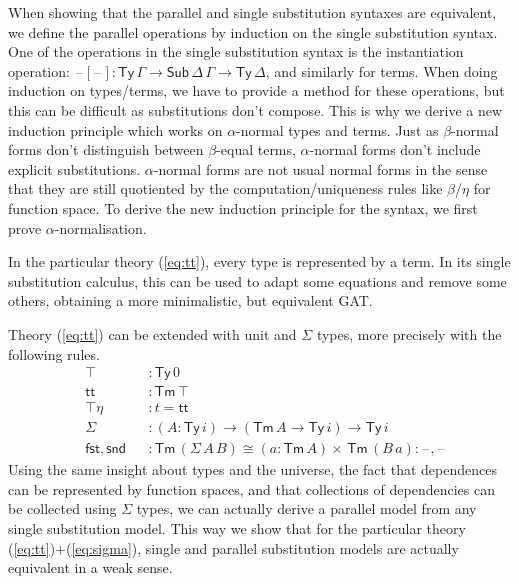 \documentclass[sigplan,10pt,anonymous,review]{acmart}\settopmatter{printfolios=true,printccs=false,printacmref=false}
\newcommand{\ra}{\rightarrow}
\newcommand{\Ty}{\mathsf{Ty}}
\newcommand{\Tm}{\mathsf{Tm}}
\newcommand{\Sub}{\mathsf{Sub}}
\newcommand{\blank}{\mathord{\hspace{1pt}\text{--}\hspace{1pt}}} %
\renewcommand{\tt}{\mathsf{tt}}
\newcommand{\fst}{\mathsf{fst}}
\newcommand{\snd}{\mathsf{snd}}
\begin{document}
When showing that the parallel and single substitution syntaxes are
equivalent, we define the parallel operations by induction on the
single substitution syntax. One of the operations in the single
substitution syntax is the instantiation operation: $\blank[\blank] :
\Ty\,\Gamma\ra\Sub\,\Delta\,\Gamma\ra\Ty\,\Delta$, and similarly for
terms. When doing induction on types/terms, we have to provide
a method for these operations, but this can be difficult as
substitutions don't compose. This is why we derive a new induction
principle which works on $\alpha$-normal types and terms. Just as
$\beta$-normal forms don't distinguish between $\beta$-equal terms,
$\alpha$-normal forms don't include explicit substitutions.
$\alpha$-normal forms are not usual normal
forms in the sense that they are still quotiented by the
computation/uniqueness rules like $\beta$/$\eta$ for function
space. To derive the new induction principle for the syntax, we first
prove $\alpha$-normalisation.

In the particular theory (\ref{eq:tt}), every type is represented by a
term. In its single substitution calculus, this can be
used to adapt some equations and remove some others, obtaining a more
minimalistic, but equivalent GAT.

Theory (\ref{eq:tt}) can be extended
with unit and $\Sigma$ types, more precisely with the following rules.
\begin{equation}\label{eq:sigma}
  \begin{alignedat}{10}
    & \top && : \Ty\,0 \\
    & \tt && : \Tm\,\top \\
    & \top\eta && : t = \tt \\
    & \Sigma && : (A:\Ty\,i)\ra(\Tm\,A\ra\Ty\,i)\ra\Ty\,i \\
    & \fst,\snd && : \Tm\,(\Sigma\,A\,B)\cong(a:\Tm\,A)\times\,\Tm\,(B\,a): \blank,\blank
\end{alignedat}
\end{equation}
Using the same insight about types and the universe, the fact that
dependences can be represented by function spaces, and that
collections of dependencies can be collected using $\Sigma$ types, we
can actually derive a parallel model from any single substitution
model. This way we show that for the particular theory (\ref{eq:tt})+(\ref{eq:sigma}),
single and parallel substitution models are actually equivalent in a
weak sense.
\end{document}
